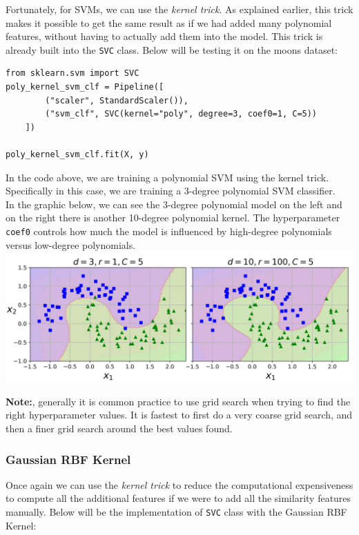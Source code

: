 \noindent
Fortunately, for SVMs, we can use the \textit{kernel trick}. As explained earlier, this trick makes it possible to get the same result
as if we had added many polynomial features, without having to actually add them into the model. This trick is already built into the 
\texttt{SVC} class. Below will be testing it on the moons dataset:

\begin{verbatim}
from sklearn.svm import SVC
poly_kernel_svm_clf = Pipeline([
        ("scaler", StandardScaler()),
        ("svm_clf", SVC(kernel="poly", degree=3, coef0=1, C=5))
    ])

poly_kernel_svm_clf.fit(X, y)
\end{verbatim}

\noindent
In the code above, we are training a polynomial SVM using the kernel trick. Specifically in this case, we are training a 3-degree 
polynomial SVM classifier.\\

\noindent
In the graphic below, we can see the 3-degree polynomial
model on the left and on the right there is another 10-degree polynomial kernel. The hyperparameter \texttt{coef0} controls
how much the model is influenced by high-degree polynomials versus low-degree polynomials.\\

\includegraphics[scale=0.45]{Images/polyKernel.PNG}

\noindent
\textbf{Note:}, generally it is common practice to use grid search when trying to find the right hyperparameter values. It is fastest to 
first do a very coarse grid search, and then a finer grid search around the best values found. 

\subsubsection{Gaussian RBF Kernel}

Once again we can use the \textit{kernel trick} to reduce the computational expensiveness to compute all the additional features if we 
were to add all the similarity features manually. Below will be the implementation of \texttt{SVC} class with the 
Gaussian RBF Kernel:

